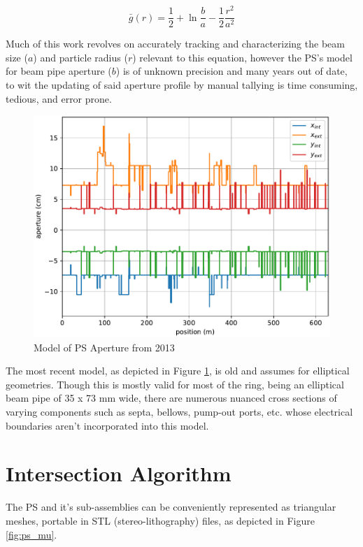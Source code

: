 $$\bar{g}(r) = \frac{1}{2} + \ln\frac{b}{a}-\frac{1}{2}\frac{r^2}{a^2}$$

Much of this work revolves on accurately tracking and characterizing the beam size ($a$) and particle radius ($r$) relevant to this equation, however the PS's model for beam pipe aperture ($b$) is of unknown precision and many years out of date, to wit the updating of said aperture profile by manual tallying is time consuming, tedious, and error prone.

\begin{figure}
    \centering
    \includegraphics{figs/ps_aperture.pdf}
    \caption{Model of PS Aperture from 2013}
    \label{fig:ps_aperture_model}
\end{figure}

The most recent model, as depicted in Figure \ref{fig:ps_aperture_model}, is old and assumes for elliptical geometries. Though this is mostly valid for most of the ring, being an elliptical beam pipe of 35 x 73 mm wide, there are numerous nuanced cross sections of varying components such as septa, bellows, pump-out ports, etc. whose electrical boundaries aren't incorporated into this model.

\section{Intersection Algorithm}

The PS and it's sub-assemblies can be conveniently represented as triangular meshes, portable in STL (stereo-lithography) files, as depicted in Figure \ref{fig:ps_mu}.

